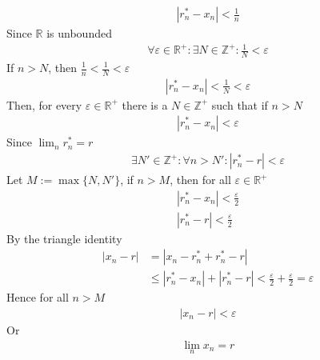 \documentclass{amsart}
\numberwithin{equation}{section}
\let\oldendproof\endproof
\renewenvironment{proof}[1][\proofname]{%
  \setcounter{case}{0}
  \setcounter{step}{0}
  \oldproof[#1]%
}{\oldendproof}
\theoremstyle{plain}
\theoremstyle{definition}
\theoremstyle{remark}
\begin{document}
\begin{proof}
\begin{align}
    |r^*_n - x_n | < \frac{1}{n}
  \end{align}
  Since $\mathbb{R}$ is unbounded
  \begin{align}
    \forall \varepsilon \in \mathbb{R}^+: \exists N\in\mathbb{Z}^+ : \frac{1}{N} < \varepsilon
  \end{align}
  If $n>N$, then $\frac{1}{n} < \frac{1}{N} < \varepsilon$
  \begin{align}
    |r^*_n-x_n| <\frac{1}{N} <  \varepsilon
  \end{align}
  Then, for every $\varepsilon\in\mathbb{R}^+$ there is a $N\in\mathbb{Z}^+$ such that if $n>N$
  \begin{align}
    |r^*_n-x_n| < \varepsilon
  \end{align}
  Since $\lim_n r^*_n = r$
  \begin{align}
    \exists N'\in\mathbb{Z}^+: \forall n> N': |r^*_n - r| < \varepsilon
  \end{align}
  Let $M:= \max\{N, N'\}$, if $n>M$, then for all $\varepsilon\in\mathbb{R}^+$
  \begin{align}
    |r^*_n-x_n| < \frac{\varepsilon}{2}\\
    |r^*_n - r| < \frac{\varepsilon}{2}
  \end{align}
  By the triangle identity
  \begin{align}
    |x_n-r | &= |x_n-r^*_n+r^*_n-r|\nonumber\\
    &\leq |r^*_n-x_n| + |r^*_n - r| < \frac{\varepsilon}{2} +  \frac{\varepsilon}{2} = \varepsilon
  \end{align}
  Hence for all $n>M$
  \begin{align}
    |x_n-r| < \varepsilon
  \end{align}
  Or
  \begin{align}
    \lim_n x_n = r
  \end{align}
\end{proof}
\end{document}

